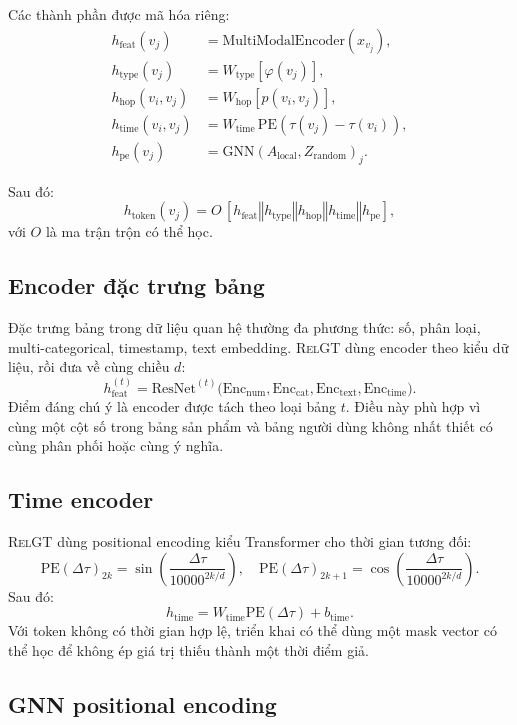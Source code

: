 \documentclass[12pt,a4paper]{article}
\newcommand{\RelGT}{\textsc{RelGT}}
\newcommand{\concat}{\mathbin{\Vert}}
\begin{document}
Các thành phần được mã hóa riêng:
\begin{align}
  h_\text{feat}(v_j) &= \text{MultiModalEncoder}(x_{v_j}),\\
  h_\text{type}(v_j) &= W_\text{type}[\varphi(v_j)],\\
  h_\text{hop}(v_i,v_j) &= W_\text{hop}[p(v_i,v_j)],\\
  h_\text{time}(v_i,v_j) &= W_\text{time}\,\text{PE}(\tau(v_j)-\tau(v_i)),\\
  h_\text{pe}(v_j) &= \text{GNN}(A_\text{local},Z_\text{random})_j.
\end{align}

Sau đó:
\[
  h_\text{token}(v_j)=
  O\,[h_\text{feat}\concat h_\text{type}\concat h_\text{hop}
  \concat h_\text{time}\concat h_\text{pe}],
\]
với $O$ là ma trận trộn có thể học.

\subsection{Encoder đặc trưng bảng}

Đặc trưng bảng trong dữ liệu quan hệ thường đa phương thức: số, phân loại,
multi-categorical, timestamp, text embedding. \RelGT{} dùng encoder theo kiểu
dữ liệu, rồi đưa về cùng chiều $d$:
\[
  h_\text{feat}^{(t)}=\text{ResNet}^{(t)}
  \bigl(\text{Enc}_\text{num},\text{Enc}_\text{cat},
  \text{Enc}_\text{text},\text{Enc}_\text{time}\bigr).
\]
Điểm đáng chú ý là encoder được tách theo loại bảng $t$. Điều này phù hợp vì
cùng một cột số trong bảng sản phẩm và bảng người dùng không nhất thiết có
cùng phân phối hoặc cùng ý nghĩa.

\subsection{Time encoder}

\RelGT{} dùng positional encoding kiểu Transformer cho thời gian tương đối:
\[
  \text{PE}(\Delta\tau)_{2k}
  =\sin\left(\frac{\Delta\tau}{10000^{2k/d}}\right),\quad
  \text{PE}(\Delta\tau)_{2k+1}
  =\cos\left(\frac{\Delta\tau}{10000^{2k/d}}\right).
\]
Sau đó:
\[
  h_\text{time}=W_\text{time}\text{PE}(\Delta\tau)+b_\text{time}.
\]
Với token không có thời gian hợp lệ, triển khai có thể dùng một mask vector
có thể học để không ép giá trị thiếu thành một thời điểm giả.

\subsection{GNN positional encoding}
\end{document}
